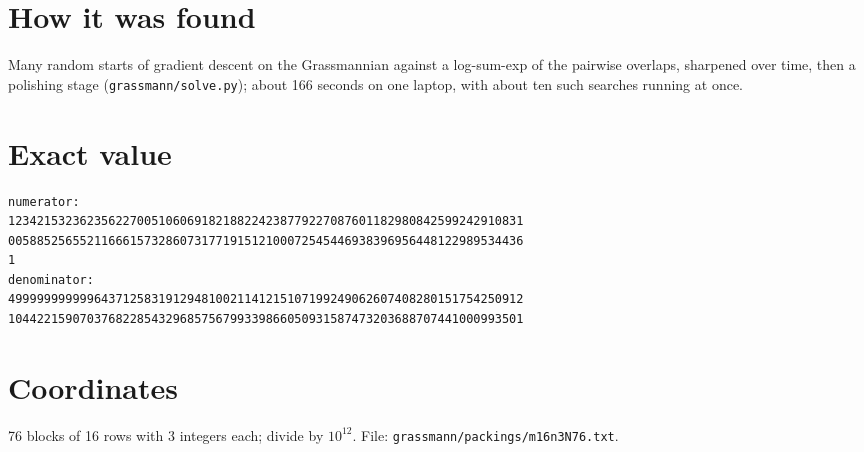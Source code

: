 \documentclass[11pt,a4paper]{article}
\begin{document}
\section{How it was found}
Many random starts of gradient descent on the Grassmannian against a log-sum-exp of the pairwise overlaps, sharpened over time, then a polishing stage (\texttt{grassmann/solve.py}); about 166 seconds on one laptop, with about ten such searches running at once.


\appendix
\section{Exact value}
{\small
\begin{verbatim}
numerator:
123421532362356227005106069182188224238779227087601182980842599242910831
005885256552116661573286073177191512100072545446938396956448122989534436
1
denominator:
499999999999643712583191294810021141215107199249062607408280151754250912
104422159070376822854329685756799339866050931587473203688707441000993501
\end{verbatim}}

\section{Coordinates}
76 blocks of 16 rows with 3 integers each; divide by $10^{12}$. File: \texttt{grassmann/packings/m16n3N76.txt}.
{\tiny
\begin{multicols}{3}
\end{multicols}}
\end{document}

